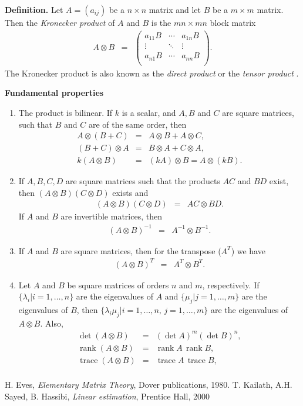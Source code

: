 \documentclass[12pt]{article}
\begin{document}
\newcommand{\rank}{\mathop{\mathrm{rank}}}
\newcommand{\trace}{\mathop{\mathrm{trace}}}

{\bf Definition.}
Let $A=(a_{ij})$ be a $n\times n$ matrix  and 
let $B$ be a $m\times m$ matrix. Then the
\emph{Kronecker product} of $A$ and $B$ is 
the $mn\times mn$ block matrix
\begin{eqnarray*}
A\otimes B &=&\left( \begin{array}{ccc} 
a_{11} B & \cdots & a_{1n} B \\
\vdots & \ddots & \vdots \\
a_{n1} B & \cdots & a_{nn} B \\
\end{array} \right).
\end{eqnarray*}
The Kronecker product is also known as the \emph{direct product}
or the \emph{tensor product} \cite{eves}. 


{\bf Fundamental properties} \cite{eves, kailath}
\begin{enumerate}
\item The product is bilinear. If $k$ is a scalar, and $A,B$ and $C$ 
are square matrices, such that $B$ and $C$
are of the same order, then
\begin{eqnarray*}
A\otimes (B+C) &=& A\otimes B + A\otimes C,\\ 
(B+C)\otimes A &=& B\otimes A + C\otimes A,\\
k(A\otimes B) &=& (kA)\otimes B = A\otimes (kB).
\end{eqnarray*}
\item If $A,B,C,D$ are square matrices such that the products $AC$ and $BD$ 
exist, then $(A\otimes B)(C\otimes D)$ exists and 
\begin{eqnarray*}
(A\otimes B)(C\otimes D) &=& AC\otimes BD.
\end{eqnarray*}
If $A$ and $B$ are invertible matrices, then
\begin{eqnarray*}
(A\otimes B)^{-1} &=& A^{-1} \otimes B^{-1}.
\end{eqnarray*}
\item If $A$ and $B$ are square matrices, then for the transpose ($A^T$) we have 
\begin{eqnarray*}
(A\otimes B)^{T} &=& A^{T} \otimes B^{T}.
\end{eqnarray*}
\item Let $A$ and $B$ be square matrices of orders $n$ and $m$, respectively. 
If $\{\lambda_i | i=1,\ldots,n \}$ are the eigenvalues of $A$ and 
 $\{\mu_j | j=1,\ldots, m \}$ are the eigenvalues of $B$, then 
$\{\lambda_i \mu_j |  i=1,\ldots, n, \, j=1,\ldots, m \}$ are the eigenvalues of 
$A\otimes B$. Also, 
\begin{eqnarray*}
\det (A\otimes B) &=& (\det A)^m (\det B)^n, \\
\rank (A\otimes B) &=& \rank A\, \rank B, \\
\trace (A\otimes B) &=& \trace A\, \trace B, \\
\end{eqnarray*}
\end{enumerate}

\begin{thebibliography}{9}
 H. Eves,
        \emph{Elementary Matrix Theory},
        Dover publications, 1980.
 T. Kailath, A.H. Sayed, B. Hassibi,
        \emph{Linear estimation},
        Prentice Hall, 2000
\end{thebibliography}
\end{document}

